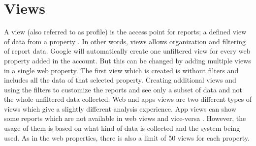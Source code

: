 \section{Views}
A view (also referred to as profile) is the access point for reports; a defined view of data from a property \cite{Hiera14:online}. In other words, views allows organization and filtering of report data. Google will automatically create one unfiltered view for every web property added in the account. But this can be changed by adding multiple views in a single web property. The first view which is created is without filters and includes all the data of that selected property. Creating additional views and using the filters to customize the reports and see only a subset of data and not the whole unfiltered data collected. Web and apps views are two different types of views which give a slightly different analysis experience. App views can show some reports which are not available in web views and vice-versa  \cite{About20:online}. However, the usage of them is based on what kind of data is collected and the system being used.
As in the web properties, there is also a limit of 50 views for each property.